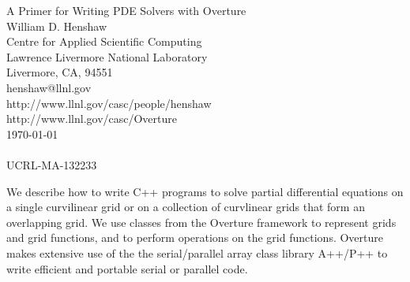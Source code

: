 \documentclass{article}
\begin{document}



%
%

\baselineskip
\begin{flushleft}
{\Large
A Primer for Writing PDE Solvers with Overture \\
}
\vspace{2\baselineskip}
William D. Henshaw\\
Centre for Applied Scientific Computing \\
Lawrence Livermore National Laboratory    \\
Livermore, CA, 94551   \\
henshaw@llnl.gov \\
http://www.llnl.gov/casc/people/henshaw \\
http://www.llnl.gov/casc/Overture
~~~\\
\today \\
~~~\\
UCRL-MA-132233

\vspace{4\baselineskip}

We describe how to write C++ programs to solve partial differential
equations on a single curvilinear grid or on a collection of
curvlinear grids that form an overlapping grid. We use classes from the
Overture framework to represent grids and grid functions, and to perform
operations on the grid functions.
Overture makes extensive use of the the serial/parallel array 
class library A++/P++ to write efficient and portable serial or parallel
code.
\end{flushleft}

\tableofcontents
\end{document}
